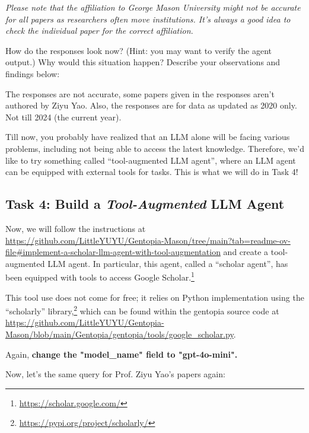 \documentclass[11pt,addpoints,answers]{exam}
\begin{document}
\begin{questions}
\begin{tcolorbox}[fit,height=10cm, width=16cm, blank, borderline={1pt}{-2pt},nobeforeafter]
\textit{Please note that the affiliation to George Mason University might not be accurate for all papers as researchers often move institutions. It's always a good idea to check the individual paper for the correct affiliation.}
    \end{tcolorbox} 

    How do the responses look now? (Hint: you may want to verify the agent output.) Why would this situation happen? Describe your observations and findings below:
    
    \begin{tcolorbox}[fit,height=2cm, width=16cm, blank, borderline={1pt}{-2pt},nobeforeafter]
    The responses are not accurate, some papers given in the responses aren't authored by Ziyu Yao. Also, the responses are for data as updated as 2020 only. Not till 2024 (the current year).
    \end{tcolorbox} 

    Till now, you probably have realized that an LLM alone will be facing various problems, including not being able to access the latest knowledge. Therefore, we'd like to try something called ``tool-augmented LLM agent'', where an LLM agent can be equipped with external tools for tasks. This is what we will do in Task 4!

    
    \clearpage\subsection*{Task 4: Build a \emph{Tool-Augmented} LLM Agent}

    Now, we will follow the instructions at \url{https://github.com/LittleYUYU/Gentopia-Mason/tree/main?tab=readme-ov-file#implement-a-scholar-llm-agent-with-tool-augmentation} and create a tool-augmented LLM agent. 
    In particular, this agent, called a ``scholar agent'', has been equipped with tools to access Google Scholar.\footnote{\url{https://scholar.google.com/}} 
    
    This tool use does not come for free; it relies on Python implementation using the ``scholarly'' library,\footnote{\url{https://pypi.org/project/scholarly/}} which can be found within the gentopia source code at \url{https://github.com/LittleYUYU/Gentopia-Mason/blob/main/Gentopia/gentopia/tools/google_scholar.py}.

    Again, \textbf{change the "model\_name" field to "gpt-4o-mini".}
    
    \question[10] Now, let's the same query for Prof. Ziyu Yao's papers again:


\end{questions}
\end{document}
